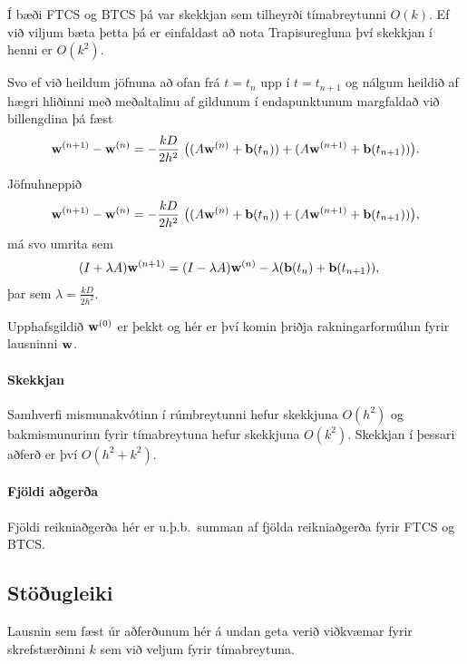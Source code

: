 \documentclass[icelandic,a4paper,12pt]{article}
\begin{document}
Í bæði FTCS og BTCS þá var skekkjan sem tilheyrði tímabreytunni $O(k)$.
Ef við viljum bæta þetta þá er einfaldast að nota Trapisuregluna
því skekkjan í henni er $O(k^2)$. \pause 

Svo ef við heildum jöfnuna að ofan frá $t=t_n$ upp í $t=t_{n+1}$ og
nálgum heildið af hægri hliðinni með meðaltalinu af gildunum í endapunktunum
margfaldað við billengdina
þá fæst
$$ 
 \mbox{${\bf w}$}^{(n+1)} - \mbox{${\bf w}$}^{(n)} =  -\frac{kD}{2h^2}\  
 \big( (A\mbox{${\bf w}$}^{(n)} + \mbox{${\bf b}$}(t_{n})) +  
 (A\mbox{${\bf w}$}^{(n+1)} + \mbox{${\bf b}$}(t_{n+1})) \big).
$$

 
 Jöfnuhneppið
 $$ 
 \mbox{${\bf w}$}^{(n+1)} - \mbox{${\bf w}$}^{(n)} =  -\frac{kD}{2h^2}\  
 \big( (A\mbox{${\bf w}$}^{(n)} + \mbox{${\bf b}$}(t_{n})) +  
 (A\mbox{${\bf w}$}^{(n+1)} + \mbox{${\bf b}$}(t_{n+1})) \big), 
$$
má svo umrita sem
\begin{align*}
 (I+\lambda A)\mbox{${\bf w}$}^{(n+1)} &= (I-\lambda A) \mbox{${\bf w}$}^{(n)}  - \lambda (\mbox{${\bf b}$}(t_{n}) 
 + \mbox{${\bf b}$}(t_{n+1})), 
\end{align*}
þar sem $\lambda = \frac{kD}{2h^2}$. \pause
 
 Upphafsgildið $\mbox{${\bf w}$}^{(0)}$ er þekkt og hér er því komin þriðja rakningarformúlun
 fyrir lausninni $\mbox{${\bf w}$}$.  \pause
 
 \paragraph{Skekkjan}
  Samhverfi mismunakvótinn í rúmbreytunni hefur skekkjuna
 $O(h^2)$ og bakmismunurinn fyrir tímabreytuna hefur skekkjuna $O(k^2)$. 
 Skekkjan í þessari aðferð er því $O(h^2 + k^2)$.
 
 
 \paragraph{Fjöldi aðgerða}
  Fjöldi reikniaðgerða hér er u.þ.b.~summan af fjölda reikniaðgerða fyrir FTCS og BTCS.
 

 
 
 
\subsection{Stöðugleiki}
 
  Lausnin sem fæst úr aðferðunum hér á undan geta verið viðkvæmar fyrir skrefstærðinni $k$  sem við 
  veljum fyrir tímabreytuna. \pause
  
\end{document}
